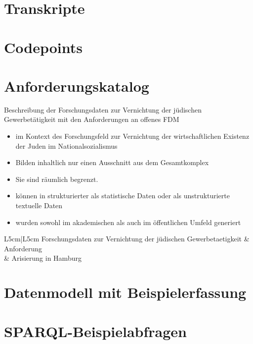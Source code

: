 \section{Transkripte}
\section{Codepoints}
\section{Anforderungskatalog}
Beschreibung der Forschungsdaten zur Vernichtung der jüdischen Gewerbetätigkeit mit den Anforderungen an offenes FDM
\begin{itemize}
    \item im Kontext des Forschungsfeld zur Vernichtung der wirtschaftlichen Existenz der Juden im Nationalsozialismus
    \item Bilden inhaltlich nur einen Ausschnitt aus dem Gesamtkomplex 
    \item Sie sind räumlich begrenzt.
    \item können in strukturierter als statistische Daten oder als unstrukturierte textuelle Daten 
    \item wurden sowohl im akademischen als auch im öffentlichen Umfeld generiert
\end{itemize}
\begin{table}
    \caption{Anforderungen an offenes Forschungsdatenmanagement}
    \label{tab:forschungsdatentabelle}
    \begin{tabular} { L{5cm}|L{5cm} }
    Forschungsdaten zur Vernichtung der jüdischen Gewerbetaetigkeit & Anforderung \\
     & Arisierung in Hamburg \\
    \hline 
    \end{tabular}
\end{table}
\section{Datenmodell mit Beispielerfassung}
\section{SPARQL-Beispielabfragen}